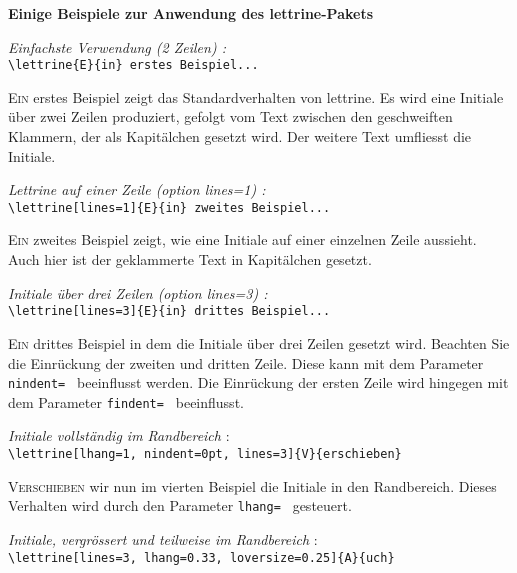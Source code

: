 \documentclass[12pt,a4paper]{article}
\begin{document}
\thispagestyle{empty}

\begin{center}
\large\bfseries Einige Beispiele zur Anwendung des lettrine-Pakets
\end{center}

\vspace{\baselineskip}
\textit{Einfachste Verwendung (2 Zeilen) :}\\
\verb+\lettrine{E}{in} erstes Beispiel...+

\lettrine{E}{in} erstes Beispiel zeigt das Standardverhalten von lettrine.
Es wird eine Initiale \"uber zwei Zeilen produziert, gefolgt vom Text zwischen
den geschweiften Klammern, der als Kapit\"alchen gesetzt wird. Der weitere
Text umfliesst die Initiale.

\vspace{\baselineskip}
\textit{Lettrine auf einer Zeile (option {\ttfamily\upshape lines=1}) :}\\
\verb+\lettrine[lines=1]{E}{in} zweites Beispiel...+

\lettrine[lines=1]{E}{in} zweites Beispiel zeigt, wie eine Initiale auf
einer einzelnen Zeile aussieht. Auch hier ist der geklammerte Text in
Kapit\"alchen gesetzt.

\vspace{\baselineskip}
\textit{Initiale \"uber drei Zeilen (option {\ttfamily\upshape lines=3}) :}\\
\verb+\lettrine[lines=3]{E}{in} drittes Beispiel...+

\lettrine[lines=3]{E}{in} drittes Beispiel in dem die Initiale \"uber drei
Zeilen gesetzt wird. Beachten Sie die Einr\"uckung der zweiten und dritten
Zeile. Diese kann mit dem Parameter \verb+nindent= + beeinflusst werden. Die
Einr\"uckung der ersten Zeile wird hingegen mit dem Parameter \verb+findent= +
beeinflusst.

\vspace{\baselineskip}
\textit{Initiale vollst\"andig im Randbereich} :\\
\verb+\lettrine[lhang=1, nindent=0pt, lines=3]{V}{erschieben}+

\lettrine[lhang=1, nindent=0pt, lines=3]{V}{erschieben} wir nun im vierten
Beispiel die Initiale in den Randbereich. Dieses Verhalten wird durch den
Parameter \verb+lhang= + gesteuert.

\vspace{\baselineskip}
\textit{Initiale, vergr\"ossert und teilweise im Randbereich} :\\
\verb+\lettrine[lines=3, lhang=0.33, loversize=0.25]{A}{uch}+
\end{document}
